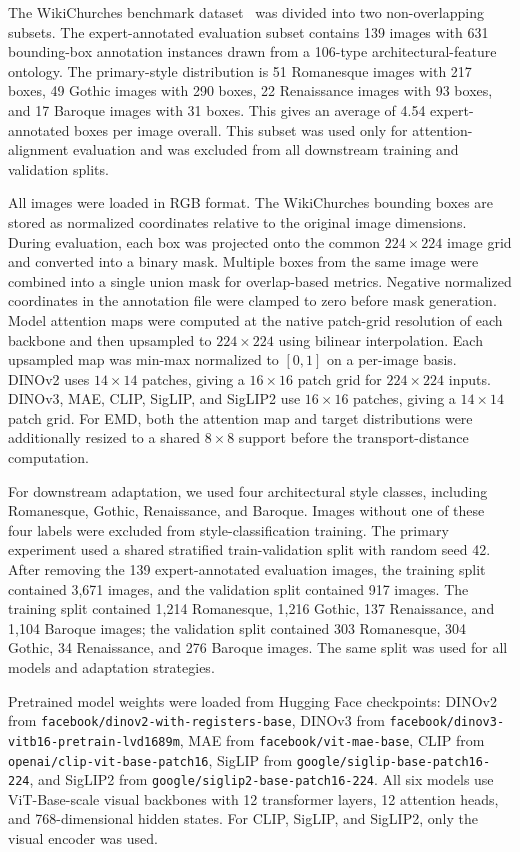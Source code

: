 \documentclass[lineno,pdflatex,sn-mathphys-num]{sn-jnl}%
\theoremstyle{thmstyleone}%
\theoremstyle{thmstyletwo}%
\theoremstyle{thmstylethree}%
\begin{document}
The WikiChurches benchmark dataset~\cite{Barz21WikiChurches} was divided into two non-overlapping subsets. The expert-annotated evaluation subset contains 139 images with 631 bounding-box annotation instances drawn from a 106-type architectural-feature ontology. The primary-style distribution is 51 Romanesque images with 217 boxes, 49 Gothic images with 290 boxes, 22 Renaissance images with 93 boxes, and 17 Baroque images with 31 boxes. This gives an average of 4.54 expert-annotated boxes per image overall. This subset was used only for attention-alignment evaluation and was excluded from all downstream training and validation splits.

All images were loaded in RGB format. The WikiChurches bounding boxes are stored as normalized coordinates relative to the original image dimensions. During evaluation, each box was projected onto the common $224 \times 224$ image grid and converted into a binary mask. Multiple boxes from the same image were combined into a single union mask for overlap-based metrics. Negative normalized coordinates in the annotation file were clamped to zero before mask generation. Model attention maps were computed at the native patch-grid resolution of each backbone and then upsampled to $224 \times 224$ using bilinear interpolation. Each upsampled map was min-max normalized to $[0,1]$ on a per-image basis. DINOv2 uses $14 \times 14$ patches, giving a $16 \times 16$ patch grid for $224 \times 224$ inputs. DINOv3, MAE, CLIP, SigLIP, and SigLIP2 use $16 \times 16$ patches, giving a $14 \times 14$ patch grid. For EMD, both the attention map and target distributions were additionally resized to a shared $8 \times 8$ support before the transport-distance computation.

For downstream adaptation, we used four architectural style classes, including Romanesque, Gothic, Renaissance, and Baroque. Images without one of these four labels were excluded from style-classification training. The primary experiment used a shared stratified train-validation split with random seed 42. After removing the 139 expert-annotated evaluation images, the training split contained 3,671 images, and the validation split contained 917 images. The training split contained 1,214 Romanesque, 1,216 Gothic, 137 Renaissance, and 1,104 Baroque images; the validation split contained 303 Romanesque, 304 Gothic, 34 Renaissance, and 276 Baroque images. The same split was used for all models and adaptation strategies.

Pretrained model weights were loaded from Hugging Face checkpoints: DINOv2 from \texttt{facebook/dinov2-with-registers-base}, DINOv3 from \texttt{facebook/dinov3-vitb16-pretrain-lvd1689m}, MAE from \texttt{facebook/vit-mae-base}, CLIP from \texttt{openai/clip-vit-base-patch16}, SigLIP from \texttt{google/siglip-base-patch16-224}, and SigLIP2 from \texttt{google/siglip2-base-patch16-224}. All six models use ViT-Base-scale visual backbones with 12 transformer layers, 12 attention heads, and 768-dimensional hidden states. For CLIP, SigLIP, and SigLIP2, only the visual encoder was used.
\end{document}
